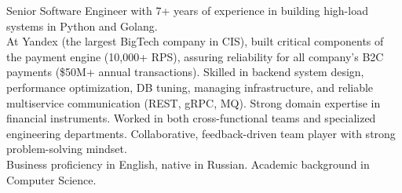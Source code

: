 
\begin{cvparagraph}
Senior Software Engineer with 7+ years of experience in building high-load systems in Python and Golang.\\
At Yandex (the largest BigTech company in CIS), built critical components of the payment engine (10,000+ RPS), assuring reliability for all company's B2C payments (\$50M+ annual transactions).
Skilled in backend system design, performance optimization, DB tuning, managing infrastructure, and reliable multiservice communication (REST, gRPC, MQ). Strong domain expertise in financial instruments.
Worked in both cross-functional teams and specialized engineering departments. Collaborative, feedback-driven team player with strong problem-solving mindset.\\
Business proficiency in English, native in Russian. Academic background in Computer Science.
\end{cvparagraph}

